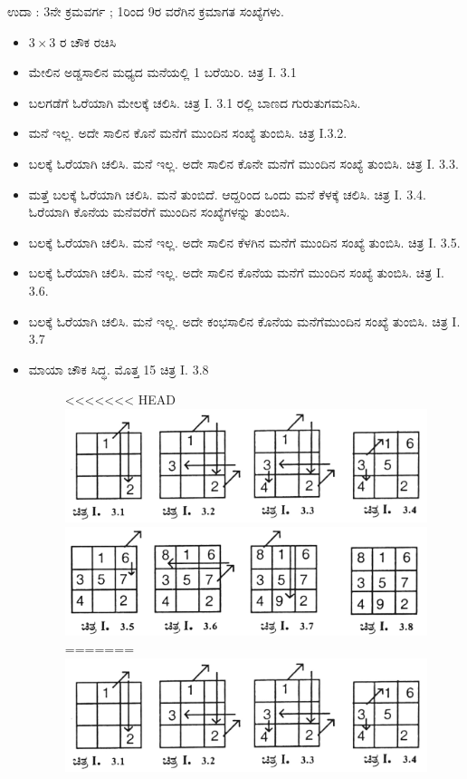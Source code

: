 ಉದಾ : 3ನೇ ಕ್ರಮವರ್ಗ ; 1ರಿಂದ 9ರ ವರೆಗಿನ ಕ್ರಮಾಗತ ಸಂಖ್ಯೆಗಳು.
\begin{itemize}
	\item $3 \times 3$ ರ ಚೌಕ ರಚಿಸಿ
	\item ಮೇಲಿನ ಅಡ್ಡಸಾಲಿನ ಮಧ್ಯದ ಮನೆಯಲ್ಲಿ 1 ಬರೆಯಿರಿ. ಚಿತ್ರ I. 3.1
	\item ಬಲಗಡೆಗೆ ಓರೆಯಾಗಿ ಮೇಲಕ್ಕೆ ಚಲಿಸಿ. ಚಿತ್ರ I. 3.1 ರಲ್ಲಿ ಬಾಣದ ಗುರುತು\break ಗಮನಿಸಿ.
	\item ಮನೆ ಇಲ್ಲ. ಅದೇ ಸಾಲಿನ ಕೊನೆ ಮನೆಗೆ ಮುಂದಿನ ಸಂಖ್ಯೆ ತುಂಬಿಸಿ. ಚಿತ್ರ I.3.2.
	\item ಬಲಕ್ಕೆ ಓರೆಯಾಗಿ ಚಲಿಸಿ. ಮನೆ ಇಲ್ಲ. ಅದೇ ಸಾಲಿನ ಕೊನೇ ಮನೆಗೆ ಮುಂದಿನ ಸಂಖ್ಯೆ ತುಂಬಿಸಿ. ಚಿತ್ರ I. 3.3.
	\item ಮತ್ತೆ ಬಲಕ್ಕೆ ಓರೆಯಾಗಿ ಚಲಿಸಿ. ಮನೆ ತುಂಬಿದೆ. ಆದ್ದರಿಂದ ಒಂದು ಮನೆ ಕೆಳಕ್ಕೆ ಚಲಿಸಿ. ಚಿತ್ರ I. 3.4. ಓರೆಯಾಗಿ ಕೊನೆಯ ಮನೆವರೆಗೆ ಮುಂದಿನ ಸಂಖ್ಯೆಗಳನ್ನು ತುಂಬಿಸಿ.
	\item ಬಲಕ್ಕೆ ಓರೆಯಾಗಿ ಚಲಿಸಿ. ಮನೆ ಇಲ್ಲ. ಅದೇ ಸಾಲಿನ ಕೆಳಗಿನ ಮನೆಗೆ ಮುಂದಿನ ಸಂಖ್ಯೆ ತುಂಬಿಸಿ. ಚಿತ್ರ I. 3.5.
	\item ಬಲಕ್ಕೆ ಓರೆಯಾಗಿ ಚಲಿಸಿ. ಮನೆ ಇಲ್ಲ. ಅದೇ ಸಾಲಿನ ಕೊನೆಯ ಮನೆಗೆ ಮುಂದಿನ ಸಂಖ್ಯೆ ತುಂಬಿಸಿ. ಚಿತ್ರ I. 3.6.
	\item ಬಲಕ್ಕೆ ಓರೆಯಾಗಿ ಚಲಿಸಿ. ಮನೆ ಇಲ್ಲ. ಅದೇ ಕಂಭಸಾಲಿನ ಕೊನೆಯ ಮನೆಗೆ\break ಮುಂದಿನ ಸಂಖ್ಯೆ ತುಂಬಿಸಿ. ಚಿತ್ರ I. 3.7
	\item ಮಾಯಾ ಚೌಕ ಸಿದ್ಧ. ಮೊತ್ತ 15 ಚಿತ್ರ I. 3.8
	\begin{figure}[h]
<<<<<<< HEAD
	\includegraphics{src/figures/chap3/fig3-6.jpg}\\
	\includegraphics{src/figures/chap3/fig3-7.jpg}
=======
	\includegraphics[scale=.9]{src/figures/chap3/fig3.6.jpg}
	\end{figure}


\end{itemize}
